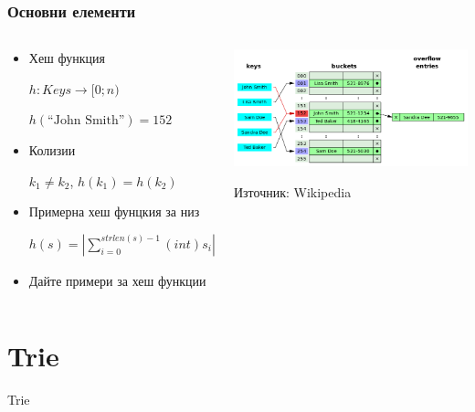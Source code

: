 \documentclass{beamer}
\begin{document}
\begin{frame}[fragile]
\frametitle{Основни елементи}


\begin{columns}[t]
  \begin{column}{0.4\textwidth}

\begin{itemize}
  \item Хеш функция

  $h:Keys \rightarrow [0;n)$

  $h(\text{``John Smith''})=152$

  \item Колизии
  
  $k_1 \neq k_2$, $h(k_1)=h(k_2)$

  \item {Примерна хеш фунцкия за низ}

  $h(s)=|\sum\limits^{strlen(s)-1}_{i=0}(int)s_i|_n$

  \item Дайте примери за хеш функции

\end{itemize}


  \end{column}
  \begin{column}{0.6\textwidth}

\begin{center}
\includegraphics[width=7cm]{images/hast1}  
\end{center}
\begin{center}
Източник: Wikipedia
\end{center}

  \end{column}
\end{columns}
\end{frame}

\section{Trie}


\begin{frame}
\centerline{Trie}
\end{frame}
\end{document}
